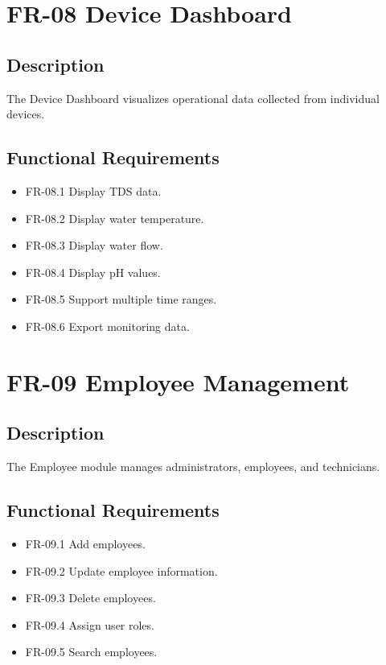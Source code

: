 \section{FR-08 Device Dashboard}

\subsection*{Description}

The Device Dashboard visualizes operational data collected from individual devices.

\subsection*{Functional Requirements}

\begin{itemize}
    \item FR-08.1 Display TDS data.
    \item FR-08.2 Display water temperature.
    \item FR-08.3 Display water flow.
    \item FR-08.4 Display pH values.
    \item FR-08.5 Support multiple time ranges.
    \item FR-08.6 Export monitoring data.
\end{itemize}

\section{FR-09 Employee Management}

\subsection*{Description}

The Employee module manages administrators, employees, and technicians.

\subsection*{Functional Requirements}

\begin{itemize}
    \item FR-09.1 Add employees.
    \item FR-09.2 Update employee information.
    \item FR-09.3 Delete employees.
    \item FR-09.4 Assign user roles.
    \item FR-09.5 Search employees.
\end{itemize}

